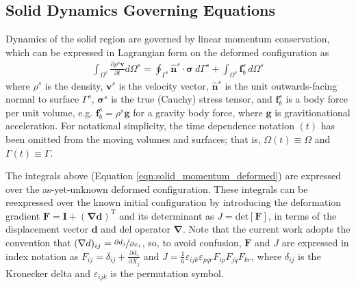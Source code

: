 \documentclass[sn-mathphys,Numbered]{sn-jnl}%
\newcommand{\bb}{\boldsymbol}
\begin{document}

\subsection{Solid Dynamics Governing Equations}
Dynamics of the solid region are governed by linear momentum conservation, which can be expressed in Lagrangian form on the deformed configuration as
\begin{eqnarray} \label{eqn:solid_momentum_deformed}
    \int_{\Omega^s} \frac{\partial \rho^s \bb{v} }{\partial t} d\Omega^s
    =
    \oint_{\Gamma^s} \hat{\bb{n}}^s \cdot \bb{\sigma} \ d\Gamma^s
    + \int_{\Omega^s}  \bb{f}_b^s \, d\Omega^s
\end{eqnarray}
where $\rho^s$ is the density, $\bb{v}^s$ is the velocity vector, $\hat{\bb{n}}^s$ is the unit outwards-facing normal to surface $\Gamma^s$, $\bb{\sigma}^s$ is the true (Cauchy) stress tensor, and $\bb{f}_b^s$ is a body force per unit volume, e.g. $\bb{f}_b^s = \rho^s \bb{g}$ for a gravity body force, where $\bb{g}$ is gravitionational acceleration.
For notational simplicity, the time dependence notation $(t)$ has been omitted from the moving volumes and surfaces; that is, $\Omega(t) \equiv \Omega$ and $\Gamma(t) \equiv \Gamma$.



The integrals above (Equation \ref{eqn:solid_momentum_deformed}) are expressed over the as-yet-unknown deformed configuration. 
These integrals can be reexpressed over the known initial configuration by introducing the deformation gradient $\bb{F} = \textbf{I} + (\bb{\nabla} \bb{d})^{\text{T}}$ and its determinant as $J = \text{det}[\bb{F}]$, in terms of the displacement vector $\bb{d}$ and del operator $\bb{\nabla}$.
Note that the current work adopts the convention that $(\nabla d)_{ij} = \nicefrac{\partial d_j}{\partial x_i}$, so, to avoid confusion, $\bb{F}$ and $J$ are expressed in index notation as $F_{ij} = \delta_{ij} + \frac{\partial d_i}{\partial X_j}$ and $J = \frac{1}{6} \varepsilon_{ijk} \varepsilon_{pqr} F_{ip} F_{jq} F_{kr}$, where $\delta_{ij}$ is the Kronecker delta and $\varepsilon_{ijk}$ is the permutation symbol.
\end{document}
